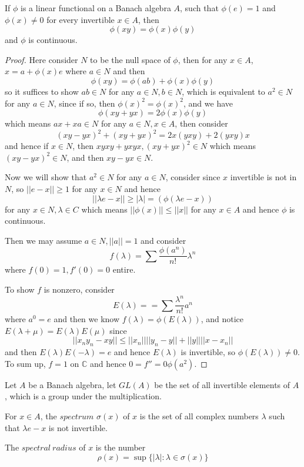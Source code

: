 \documentclass[lang=en, color=blue, ]{elegantbook}
\newcommand{\C}{\mathbb{C}}
\begin{document}
\begin{theorem}
    If $\phi$ is a linear functional on a Banach algebra $A$, such that $\phi(e)=1$ and $\phi(x) \neq 0$ for every invertible $x\in A$, then
    \[\phi(xy) = \phi(x)\phi(y)\]
    and $\phi$ is continuous.
\end{theorem}
\begin{proof}
    Here consider $N$ to be the null space of $\phi$, then for any $x\in A$, $x = a + \phi(x)e$ where $a \in N$ and then
    \[\phi(xy) = \phi(ab) + \phi(x)\phi(y)\]
    so it suffices to show $ab\in N$ for any $a\in N, b\in N$, which is equivalent to $a^2 \in N$ for any $a\in N$, since if so, then $\phi(x)^2 = \phi(x)^2$, and we have
    \[
    \phi(xy+yx) = 2\phi(x)\phi(y)
    \]
    which means $ax+xa \in N$ for any $a\in N, x\in A$, then consider
    \[
    (xy-yx)^2+(xy+yx)^2 = 2x(yxy)+2(yxy)x
    \] 
    and hence if $x\in N$, then $xyxy + yxyx, (xy+yx)^2 \in N$ which means $(xy-yx)^2 \in N$, and then $xy - yx\in N$.\par
    Now we will show that $a^2 \in N$ for any $a\in N$, consider since $x$ invertible is not in $N$, so $||e-x|| \geq 1$ for any $x\in N$ and hence
    \[||\lambda e-x|| \geq |\lambda| = (\phi(\lambda e-x))\]
    for any $x\in N, \lambda \in C$ which means $||\phi(x)|| \leq ||x||$ for any $x\in A$ and hence $\phi$ is continuous.\par
    Then we may assume $a\in N, ||a|| = 1$ and consider
    \[f(\lambda) = \sum\limits \dfrac{\phi(a^n)}{n!}\lambda^n\]
    where $f(0) = 1, f'(0) = 0$ entire.\par
    To show $f$ is nonzero, consider
    \[E(\lambda) == \sum \dfrac{\lambda^n}{n!}a^n\]
    where $a^0 = e$ and then we know $f(\lambda) = \phi(E(\lambda))$, and notice $E(\lambda+\mu) = E(\lambda)E(\mu)$ since
    \[
    ||x_ny_n - xy|| \leq ||x_n||||y_n-y||+||y||||x-x_n||
    \]
    and then $E(\lambda)E(-\lambda) = e$ and hence $E(\lambda)$ is invertible, so $\phi(E(\lambda)) \neq 0$. To sum up, $f = 1$ on $\C$ and hence $0 = f'' = 0\phi(a^2)$. 
\end{proof}

\begin{definition}
    Let $A$ be a Banach algebra, let $GL(A)$ be the set of all invertible elements of $A$, which is a group under the multiplication.\par
    For $x\in A$, the $spectrum$ $\sigma(x)$ of $x$ is the set of all complex numbers $\lambda$ such that $\lambda e -x$ is not invertible.\par
    The $spectral\ radius$ of $x$ is the number
    \[\rho(x) = \sup \{|\lambda|: \lambda \in \sigma(x)\}\]
\end{definition}
\end{document}
